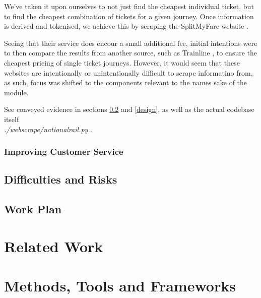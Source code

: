 \documentclass[11pt]{article}
\begin{document}
We've taken it upon ourselves to not just find the cheapest individual ticket, but to find the cheapest combination of tickets for a given journey. Once information is derived and tokenised, we achieve this by scraping the SplitMyFare website \cite{splitmyfare}.

Seeing that their service does encour a small additional fee, initial intentions were to then compare the results from another source, such as Trainline \cite{trainline}, to ensure the cheapest pricing of single ticket journeys. However, it would seem that these websites are intentionally or unintentionally difficult to scrape informatino from, as such, focus was shifted to the components relevant to the names sake of the module.

See conveyed evidence in sections \ref{work-plan} and \ref{design}, as well as the actual codebase itself\\ \textit{./webscrape/nationalrail.py} \cite{repo}.

\subsubsection{Improving Customer Service} \label{improving-service}


\subsection{Difficulties and Risks} \label{difficulties-risks}


\subsection{Work Plan} \label{work-plan}


\section{Related Work} \label{related-work}

\section{Methods, Tools and Frameworks} \label{methods-tools-frameworks}
\end{document}
